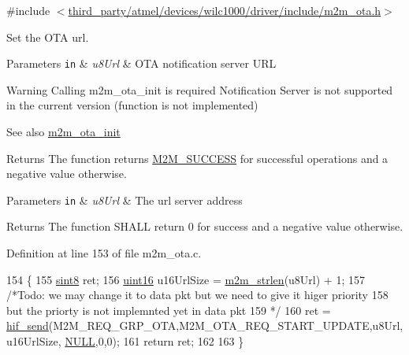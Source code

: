 {\ttfamily \#include $<$\hyperlink{m2m__ota_8h}{third\+\_\+party/atmel/devices/wilc1000/driver/include/m2m\+\_\+ota.\+h}$>$}



Set the O\+TA url. 


\begin{DoxyParams}[1]{Parameters}
\mbox{\tt in}  & {\em u8\+Url} & O\+TA notification server U\+RL \\
\hline
\end{DoxyParams}
\begin{DoxyWarning}{Warning}
Calling m2m\+\_\+ota\+\_\+init is required Notification Server is not supported in the current version (function is not implemented) 
\end{DoxyWarning}
\begin{DoxySeeAlso}{See also}
\hyperlink{group__OtaInitFn_gacd2a1a8ffaccc3deb1970cf1ad41ceec}{m2m\+\_\+ota\+\_\+init} 
\end{DoxySeeAlso}
\begin{DoxyReturn}{Returns}
The function returns \hyperlink{nm__common_8h_a9ef27ba27aafdd1aa3a79d3ba2c36b8f}{M2\+M\+\_\+\+S\+U\+C\+C\+E\+SS} for successful operations and a negative value otherwise.
\end{DoxyReturn}

\begin{DoxyParams}[1]{Parameters}
\mbox{\tt in}  & {\em u8\+Url} & The url server address\\
\hline
\end{DoxyParams}
\begin{DoxyReturn}{Returns}
The function S\+H\+A\+LL return 0 for success and a negative value otherwise. 
\end{DoxyReturn}


Definition at line 153 of file m2m\+\_\+ota.\+c.


\begin{DoxyCode}
154 \{
155     \hyperlink{group__DataT_gae35f10ffd0ac8dd2bc3e794da9bdfbc7}{sint8} ret;
156     \hyperlink{group__DataT_ga1daa745171fc6e31d942c161422a76f9}{uint16} u16UrlSize = \hyperlink{nm__common_8h_a3c10c83b6b5eda6b18bbc40ca411eeb4}{m2m\_strlen}(u8Url) + 1; 
157     \textcolor{comment}{/*Todo: we may change it to data pkt but we need to give it higer priority}
158 \textcolor{comment}{            but the priorty is not implemnted yet in data pkt}
159 \textcolor{comment}{    */}
160     ret = \hyperlink{m2m__hif_8c_a13ba8ad11b2ac39516ca787386d16ce0}{hif\_send}(M2M\_REQ\_GRP\_OTA,M2M\_OTA\_REQ\_START\_UPDATE,u8Url,u16UrlSize,
      \hyperlink{group__BSPDefine_ga070d2ce7b6bb7e5c05602aa8c308d0c4}{NULL},0,0);
161     \textcolor{keywordflow}{return} ret;
162 
163 \}
\end{DoxyCode}
